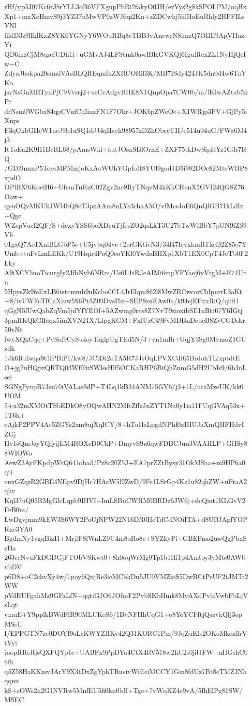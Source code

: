 rHf/yp5J07Kc6rJ8rYLL3oB6VFXgupPbRi2fakyO0JH/ezVys2g8kSPOLPM/oqHx
Xp1+mxXeHmvS9j3YZ37uMwVP0zWJ6qi2Kn+zZDCwhj5iilHoEuRhly2HPFILsYNl
flldD3z9lIklKxZ8YK6YGNyY6WOuRBq8eTBBJvAnewrN8imzQ7OIHf9ApVIIuzYi
QD6mzCjM8qzcfUDh1i+uGMvAJ4LFStmk0awIBKGVKQj6IgulRcxZL1NyHjQefw+C
ZdyaJbakpa20smalVAsBLQREqmfxZXRCORil3K/MB7ISdy424JK5dn0d4w6TuYKo
jarNsGnMRTynPjC9Vvsrj2+usCcAdgvBHE8N1QnpOpa7CW0b/m/fKlwAZtab5nPr
drNsm0WGbx84qpCVufChIiuzFN1F7Okr+JOK6pZWeOe+X1WRjp3PV+GjPy5iXnps
F3qOkbGHcW1ucJ9b1uSQ1dJJ4qHsyh98957zDZkObccUH/e514u04uG/FWa6M4j3
ItToEa2K9H1BcRL68/pAmsWki+autJOsnSBlOrnE+ZXF75tkDwSipItYz1G3r7RQ
/GDi9nnnP5ToesMFMmjoKxAoWUhYGpfoH8YUl9godJD5i982DOc82MtcWHP8xpdO
OPlBX9iKoeiH6+UfcmTuEuC02Zgv2ne9RyTNqvM4kKkCRenX5GVI24QG8Z76Oaw+
qyuOQvMKUkJWI4bQ8cT3pzAAm8nLYe3chaA5O/vfMcsJoE6QnQlGB71kLdlx+Qgc
WZcpVucf2QF/S+dcxyYSS6boXDcuTjfesZO2qsLkT3U27bTwWlBbY7pUN9fZS9V6
01gaQ7Ao1XmBLGbP5s+U5jvbq04vc+2erGKtivN3/34f47IcvxkmRTkcD2Z85e7Y
Umb+tuFvLmLEKk/U19l4qir4PoQ0eoYKl0YwdoBHXp1XbT1EX0CpT4JcTb0F2Lky
A9iXCY5uoTicurgIy2JfbNyb6NRm/Us6L1tRJeAIMi6mpYFYaej6yVtgM+E74Unn
9HpysZk9feExLB6tstcmmh9nKcbo0CL4JrElqm862l8MwZRCwcorChlpnrrL3aKt
+8/ivUWFcTfCaXiuw5S6Pt5Z09DvsI5x+SEP8znEAw0h/k94ejEFxxRiQ/qiifi1
qGgN5lUwQabZqVm5jdYfYEOf+5AZwing0res8Z7NvT9zioxibSE1nBtt07Y6IGtj
3pmRKQkGlIaqx5imXVN21X/LlpgKGM+FxfUzC49FvMDBnDeucB8ZvCGDskr50vNt
fwyXQkCqq+PvSaf9CySu4oyTaglpUgTEd5N/3+vn1mIh+UqjY3Sg0MymoZ1GUzdk
1Jk6Rulwqa9t1iPBlPI/kw8/JCiDt2oTA5R7JJsOqLPVXCd0j5BrdohTLixptdtE
O+jg2uHQpxQRTQ03WfEtiSWlssHlf5OCKaRHP6BiQhZnmG5dH2UbIs9/6b3nLsei
SGNgFyupR73su70iVALas8dP+T4Lq1kB34ANM75GY6/j3+1L/uraMzeUK/kk0UOM
5+x32mXMOtTSbEDkO8yOQwAHN2MfcZffzJnZYT1Na0y1ia11FUqGVAq53x+1T6h+
eAjkP2PPV4Ac5ZGYs2xm8ujXqICY/8+hTo1laLpgdNPhl0xIHUJaXmQHFHdvIZGj
Hy1sQmJsyYQfyijLM4ROXeD0CkP+DmyvS9u6qwFDBCJuu3VAAHLP+GHSy88WIOWo
AewZ3AyFKpdpWtQ641obad/Pz8c20Z5J+EA7prZZtBysy31OkM8ha+m9HP6a0qti
cnxGZqzR2GBE4NEpv9DjHc7HAcW5l9ZwD/9Fe1LSrGp4Kz1u82qkZW+uFraA2qkv
Kql37uQ05RMgGlcLqpb9IHVI+ImLSBuCWRM0BRDz6JW6j+dcQmt1KLGvV2FeB0m/
LwDgvjmm9kEW3S6WY2PoUjNPW22N16DR0HeTdCdNOiITA+d8UBJAgfYOPRxe3YA0
BgdmNy1vgqBizI1+MrjlF8fWnLZ9U4m8oRo8e+SYZkyPi+GBEFmo2uwQgPbnSzHa
263ccNvuFkDGDGjFTObVSKwt0+8h0oqWrMg0Tp1b1Hi1p4Amtoy3yMtc0AWbvbDV
p6D8+oC2ckvXy4w/1poy6QujRe3ieMCbkDn5JU0VMZioS5DwBCtPeUF2tJMTr2WW
pVdRUFgahMz9GFaLfN+qqtiGJO6JOfmF2PvbSKbHmk8MyAXdPvlnVwbFbLjVsLqt
vmuE+Y9pplkBWdFfR90MLUKoS6/1BvNFHhUqG1+o8YeYCFftjQszvkQlj3opMSsU
I/EPPGTN7zc0DOYf9oLcKWYZRKv42Q31KORC1Pm/9JqZuKls2OKoMkezlIrVtVyi
iuopRReRjsQXFQYp1c+UABFx9PpDYa4CtX4RV518w2hU2s0jilJFW+nHGshC06fk
q5Z58HaKKmvJArY9X3tDxZgYphTRusivWiEeiMCCY1Gm8fdUz7Bt8eTMZJNhqqnu
kS+sOWs2n2G1NVRw5MnfEU5fi0kn0bH+Tge+7vWqKZ4e9vA/5fhElPg81SW/MSEC
